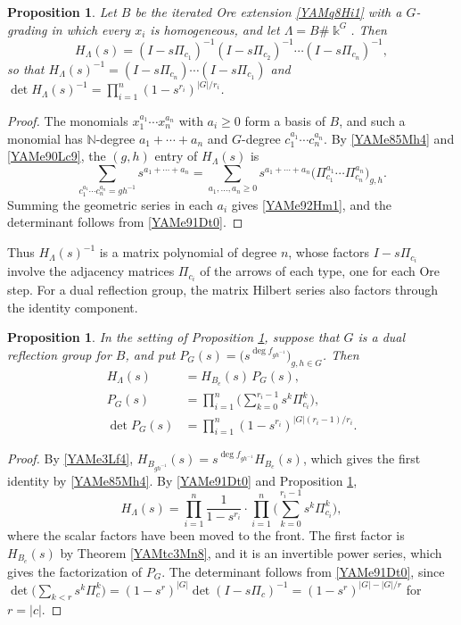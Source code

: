 \documentclass[reqno]{amsart}
\numberwithin{equation}{section}
\newtheorem{proposition}[equation]{Proposition}
\theoremstyle{definition}
\theoremstyle{remark}
\theoremstyle{plain}
\newcommand{\kk}{\Bbbk}
\begin{document}
\begin{proposition}\label{YAMp11Mh2}
Let $B$ be the iterated Ore extension \eqref{YAMq8Hi1} with a $G$-grading in which every $x_i$ is homogeneous, and let $\Lambda=B\#\kk^G$. Then
\begin{equation}\label{YAMe92Hm1}
H_\Lambda(s)=(I-s\Pi_{c_1})^{-1}(I-s\Pi_{c_2})^{-1}\cdots(I-s\Pi_{c_n})^{-1},
\end{equation}
so that $H_\Lambda(s)^{-1}=(I-s\Pi_{c_n})\cdots(I-s\Pi_{c_1})$ and $\det H_\Lambda(s)^{-1}=\prod_{i=1}^n(1-s^{r_i})^{|G|/r_i}$.
\end{proposition}

\begin{proof}
The monomials $x_1^{a_1}\cdots x_n^{a_n}$ with $a_i\ge0$ form a basis of $B$, and such a monomial has $\mathbb N$-degree $a_1+\cdots+a_n$ and $G$-degree $c_1^{a_1}\cdots c_n^{a_n}$. By \eqref{YAMe85Mh4} and \eqref{YAMe90Lc9}, the $(g,h)$ entry of $H_\Lambda(s)$ is
\[
\sum_{c_1^{a_1}\cdots c_n^{a_n}=gh^{-1}}s^{a_1+\cdots+a_n}=\sum_{a_1,\dots,a_n\ge0}s^{a_1+\cdots+a_n}\big(\Pi_{c_1}^{a_1}\cdots\Pi_{c_n}^{a_n}\big)_{g,h}.
\]
Summing the geometric series in each $a_i$ gives \eqref{YAMe92Hm1}, and the determinant follows from \eqref{YAMe91Dt0}.
\end{proof}

Thus $H_\Lambda(s)^{-1}$ is a matrix polynomial of degree $n$, whose factors $I-s\Pi_{c_i}$ involve the adjacency matrices $\Pi_{c_i}$ of the arrows of each type, one for each Ore step. For a dual reflection group, the matrix Hilbert series also factors through the identity component.

\begin{proposition}\label{YAMc14Pm3}
In the setting of Proposition \ref{YAMp11Mh2}, suppose that $G$ is a dual reflection group for $B$, and put $P_G(s)=\big(s^{\deg f_{gh^{-1}}}\big)_{g,h\in G}$. Then
\begin{equation}\label{YAMe93Pg2}
\begin{aligned}
H_\Lambda(s)&=H_{B_e}(s)\,P_G(s),\\
P_G(s)&=\prod_{i=1}^n\Big(\sum_{k=0}^{r_i-1}s^k\Pi_{c_i}^k\Big),\\
\det P_G(s)&=\prod_{i=1}^n(1-s^{r_i})^{|G|(r_i-1)/r_i}.
\end{aligned}
\end{equation}
\end{proposition}

\begin{proof}
By \eqref{YAMe3Lf4}, $H_{B_{gh^{-1}}}(s)=s^{\deg f_{gh^{-1}}}H_{B_e}(s)$, which gives the first identity by \eqref{YAMe85Mh4}. By \eqref{YAMe91Dt0} and Proposition \ref{YAMp11Mh2},
\[
H_\Lambda(s)=\prod_{i=1}^n\frac{1}{1-s^{r_i}}\cdot\prod_{i=1}^n\Big(\sum_{k=0}^{r_i-1}s^k\Pi_{c_i}^k\Big),
\]
where the scalar factors have been moved to the front. The first factor is $H_{B_e}(s)$ by Theorem \ref{YAMtc3Mn8}, and it is an invertible power series, which gives the factorization of $P_G$. The determinant follows from \eqref{YAMe91Dt0}, since $\det\big(\sum_{k<r}s^k\Pi_c^k\big)=(1-s^r)^{|G|}\det(I-s\Pi_c)^{-1}=(1-s^r)^{|G|-|G|/r}$ for $r=|c|$.
\end{proof}
\end{document}
